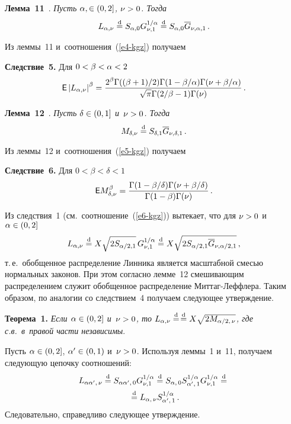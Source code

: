 \begin{multicols}{2}
\smallskip

\noindent
\textbf{Лемма~11}~\cite{Devroye1990, Pakes1998}. \textit{Пусть
$\alpha\hm,\in(0,2]$, $\nu\hm>0$. Тогда} 
$$
L_{\alpha,\nu}\stackrel{\mathrm{d}}{=} S_{\alpha,0} G_{\nu,1}^{1/\alpha}\stackrel{\mathrm{d}}{=}
S_{\alpha,0}\overline{G}_{\nu,\alpha,1}\,.
$$


\smallskip

Из леммы~11 и~соотношения~(\ref{e4-kgz}) получаем

\smallskip

\noindent
\textbf{Следствие~5.} Для $0\hm<\beta\hm<\alpha\hm<2$
$$
{\sf E}\left\vert L_{\alpha,\nu}\right\vert^{\beta}=
\displaystyle\frac{\displaystyle 2^{\beta}\Gamma(({\beta+1})/{2})\Gamma(1-{\beta}/{\alpha})
\Gamma(\nu+{\beta}/{\alpha})\mathstrut}{\displaystyle \sqrt{\pi}
\Gamma({2}/{\beta}-1)\Gamma(\nu)\mathstrut}\,.
$$

\smallskip

\noindent
\textbf{Лемма~12}~\cite{Mathai2010, MathaiHaubold2011, Joseetal}. 
\textit{Пусть $\delta\hm\in(0,1]$ и~$\nu\hm>0$. Тогда} 
$$
M_{\delta,\nu}\stackrel{\mathrm{d}}{=} S_{\delta,1}\overline{G}_{\nu,\delta,1}\,.
$$

\smallskip

Из леммы~12 и~соотношения~(\ref{e5-kgz}) получаем

\smallskip

\noindent
\textbf{Следствие~6.} Для $0<\beta<\delta<1$
$$
{\sf E}
M_{\delta,\nu}^{\beta}=\displaystyle\frac{\displaystyle \Gamma(1-{\beta}/{\delta})\Gamma
(\nu+{\beta}/{\delta})\mathstrut}{\displaystyle \Gamma(1-\beta)\Gamma(\nu)\mathstrut}\,.
$$

\smallskip

Из следствия~1 (см.\ соотношение~(\ref{e6-kgz})) вытекает, что для $\nu\hm>0$ 
и~$\alpha\hm\in(0,2]$
$$
L_{\alpha,\nu}\stackrel{\mathrm{d}}{=} X \sqrt{2S_{\alpha/2,1}}\,
G_{\nu,1}^{1/\alpha}\stackrel{\mathrm{d}}{=}
X \sqrt{2S_{\alpha/2,1} \overline{G}_{\nu,\alpha/2,1}}\,,
$$
т.\,е.\ обобщенное распределение Линника является масштабной смесью
нормальных законов. При этом согласно лемме~12 смешивающим
распределением служит обобщенное распределение Мит\-таг-Леф\-фле\-ра.
Таким образом, по аналогии со следствием~4 получаем следующее
утверждение.

\smallskip

\noindent
\textbf{Теорема~1.} \textit{Если $\alpha\hm\in(0,2]$ и~$\nu\hm>0$, то
$L_{\alpha,\nu}\stackrel{\mathrm{d}}{=}$\linebreak $\stackrel{\mathrm{d}}{=} X \sqrt{2M_{\alpha/2,\,\nu}}$, где с.в.\ 
в~правой части независимы}.

\smallskip

Пусть $\alpha\hm\in(0,2]$, $\alpha'\hm\in(0,1)$ и~$\nu\hm>0$. Используя леммы~1 и~11, 
получаем следующую цепочку соотношений:
\begin{multline*}
L_{\alpha\alpha',\,\nu}\stackrel{\mathrm{d}}{=} S_{\alpha\alpha',\,0}
G_{\nu,1}^{1/\alpha}\stackrel{\mathrm{d}}{=} S_{\alpha,\,0}
S_{\alpha',\,1}^{1/\alpha} G_{\nu,1}^{1/\alpha}\stackrel{\mathrm{d}}{=}{}\\
{}\stackrel{\mathrm{d}}{=}
L_{\alpha,\,\nu} S_{\alpha',\,1}^{1/\alpha}\,.
\end{multline*}
Следовательно, справедливо следующее утверждение.


\end{multicols}
